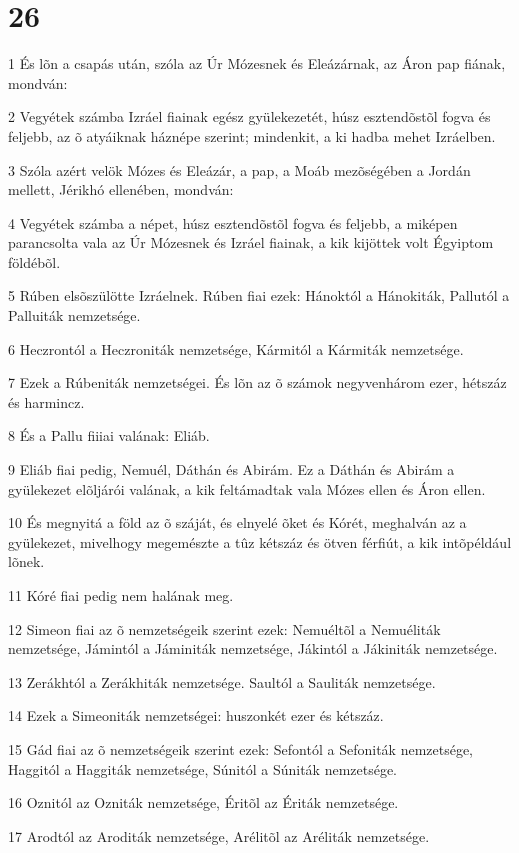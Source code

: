 \chapter{26}

\par 1 És lõn a csapás után, szóla az Úr Mózesnek és Eleázárnak, az Áron pap fiának, mondván:
\par 2 Vegyétek számba Izráel fiainak egész gyülekezetét, húsz esztendõstõl fogva és feljebb, az õ atyáiknak háznépe szerint; mindenkit, a ki hadba mehet Izráelben.
\par 3 Szóla azért velök Mózes és Eleázár, a pap, a Moáb mezõségében a Jordán mellett, Jérikhó ellenében, mondván:
\par 4 Vegyétek számba a népet, húsz esztendõstõl fogva és feljebb, a miképen parancsolta vala az Úr Mózesnek és Izráel fiainak, a kik kijöttek volt Égyiptom földébõl.
\par 5 Rúben elsõszülötte Izráelnek. Rúben fiai ezek: Hánoktól a Hánokiták, Pallutól a Palluiták nemzetsége.
\par 6 Heczrontól a Heczroniták nemzetsége, Kármitól a Kármiták nemzetsége.
\par 7 Ezek a Rúbeniták nemzetségei. És lõn az õ számok negyvenhárom ezer, hétszáz és harmincz.
\par 8 És a Pallu fiiiai valának: Eliáb.
\par 9 Eliáb fiai pedig, Nemuél, Dáthán és Abirám. Ez a Dáthán és Abirám a gyülekezet elõljárói valának, a kik feltámadtak vala Mózes ellen és Áron ellen.
\par 10 És megnyitá a föld az õ száját, és elnyelé õket és Kórét, meghalván az a gyülekezet, mivelhogy megemészte a tûz kétszáz és ötven férfiút, a kik intõpéldául lõnek.
\par 11 Kóré fiai pedig nem halának meg.
\par 12 Simeon fiai az õ nemzetségeik szerint ezek: Nemuéltõl a Nemuéliták nemzetsége, Jámintól a Jáminiták nemzetsége, Jákintól a Jákiniták nemzetsége.
\par 13 Zerákhtól a Zerákhiták nemzetsége. Saultól a Sauliták nemzetsége.
\par 14 Ezek a Simeoniták nemzetségei: huszonkét ezer és kétszáz.
\par 15 Gád fiai az õ nemzetségeik szerint ezek: Sefontól a Sefoniták nemzetsége, Haggitól a Haggiták nemzetsége, Súnitól a Súniták nemzetsége.
\par 16 Oznitól az Ozniták nemzetsége, Éritõl az Ériták nemzetsége.
\par 17 Arodtól az Aroditák nemzetsége, Arélitõl az Aréliták nemzetsége.
